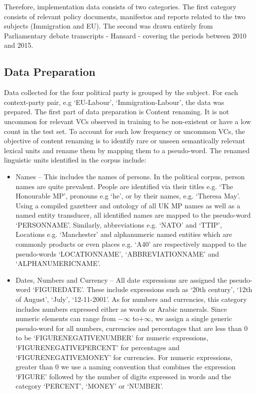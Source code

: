 Therefore, implementation data consists of two categories. The first category consists of relevant policy documents, manifestos and reports related to the two subjects (Immigration and EU). The second was drawn entirely from Parliamentary debate transcripts - Hansard - covering the periods between 2010 and 2015. 

\subsection{Data Preparation}
Data collected for the four political party is grouped by the subject. For each context-party pair, e.g `EU-Labour', `Immigration-Labour', the data was prepared. The first part of data preparation is Content renaming. It is not uncommon for relevant VCs observed in training to be non-existent or have a low count in the test set. To account for such low frequency or uncommon VCs, the objective of content renaming is to identify rare or unseen semantically relevant lexical units and rename them by mapping them to a pseudo-word. The renamed linguistic units identified in the corpus include:
\begin{itemize}
\item
Names -- This includes the names of persons. In the political corpus, person names are quite prevalent. People are identified via their titles e.g. `The Honourable MP', pronouns e.g `he', or by their names, e.g. `Theresa May'. Using a compiled gazetteer and ontology of all UK MP names as well as a named entity transducer, all identified names are mapped to the pseudo-word `PERSONNAME'. Similarly, abbreviations e.g. `NATO' and `TTIP', Locations e.g. `Manchester' and alphanumeric named entities which are commonly products or even places e.g. `A40' are respectively mapped to the pseudo-words `LOCATIONNAME', `ABBREVIATIONNAME' and `ALPHANUMERICNAME'. 
\item
Dates, Numbers and Currency -- All date expressions are assigned the pseudo-word `FIGUREDATE'. These include expressions such as `20th century', `12th of August', `July', `12-11-2001'. As for numbers and currencies, this category includes numbers expressed either as words or Arabic numerals. Since numeric elements can range from $-\infty$ to$+\infty$, we assign a single generic pseudo-word for all numbers, currencies and percentages that are less than 0 to be `FIGURENEGATIVENUMBER' for numeric expressions, `FIGURENEGATIVEPERCENT' for percentages and `FIGURENEGATIVEMONEY' for currencies. For numeric expressions, greater than 0 we use a naming convention that combines the expression `FIGURE' followed by the number of digits expressed in words and the category `PERCENT', `MONEY' or `NUMBER'.
\end{itemize}

